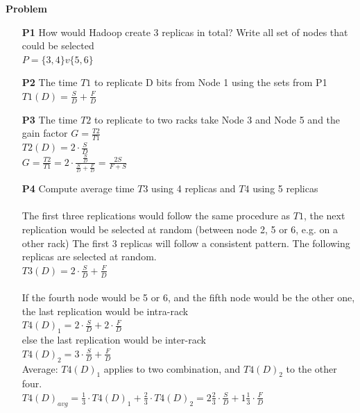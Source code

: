 \textbf{Problem}
\begin{itemize}
    \item[\textbf{P1}] How would Hadoop create 3 replicas in total? Write all set of nodes that could be selected\\
    $P = \{3,4\} v \{5,6\}$
    \item[\textbf{P2}] The time $T1$ to replicate D bits from Node 1 using the sets from P1\\
    $T1(D)=\frac{S}{D}+\frac{F}{D}$ 
    \item[\textbf{P3}] The time $T2$ to replicate to two racks take Node 3 and Node 5 and the gain factor $G=\frac{T2}{T1}$\\
    $T2(D)=2\cdot\frac{S}{D}$ \\
    $G=\frac{T2}{T1}=2\cdot\frac{\frac{S}{D}}{\frac{S}{D}+\frac{F}{D}}=\frac{2S}{F+S}$
    \item[\textbf{P4}] Compute average time $T3$ using 4 replicas and $T4$ using 5 replicas\\\\
    The first three replications would follow the same procedure as $T1$, the next replication would be selected at random (between node 2, 5 or 6, e.g. on a other rack)
    The first 3 replicas will follow a consistent pattern. The following replicas are selected at random. \\
    $T3(D)=2\cdot\frac{S}{D}+\frac{F}{D}$ \\\\
    If the fourth node would be 5 or 6, and the fifth node would be the other one, the last replication would be intra-rack\\
    $T4(D)_1=2\cdot\frac{S}{D}+2\cdot\frac{F}{D}$\\
    else the last replication would be inter-rack\\
    $T4(D)_2=3\cdot\frac{S}{D}+\frac{F}{D}$ \\
    Average: $T4(D)_1$ applies to two combination, and $T4(D)_2$ to the other four.\\
    $T4(D)_{avg} = \frac{1}{3} \cdot T4(D)_1 + \frac{2}{3} \cdot T4(D)_2 = 2\frac{2}{3}\cdot\frac{S}{D} + 1\frac{1}{3}\cdot\frac{F}{D}$
\end{itemize}